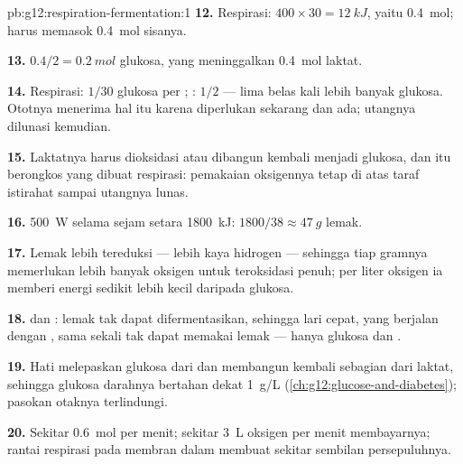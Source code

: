 \begin{solution}{pb:g12:respiration-fermentation:1}
\textbf{12.} Respirasi: $400 \times 30 = \qty{12}{kJ}$, yaitu
\qty{0.4}{mol};  harus memasok \qty{0.4}{mol} sisanya.

\textbf{13.} $0.4/2 = \qty{0.2}{mol}$ glukosa, yang meninggalkan \qty{0.4}{mol}
laktat.

\textbf{14.} Respirasi: $1/30$ glukosa per ; : $1/2$
--- lima belas kali lebih banyak glukosa. Ototnya menerima hal itu
karena  diperlukan sekarang dan  ada; utangnya dilunasi
kemudian.

\textbf{15.} Laktatnya harus dioksidasi atau dibangun kembali menjadi
glukosa, dan itu berongkos  yang dibuat respirasi: pemakaian
oksigennya tetap di atas taraf istirahat sampai utangnya lunas.

\textbf{16.} \qty{500}{W} selama sejam setara \qty{1800}{kJ}: $1800/38
\approx \qty{47}{g}$ lemak.

\textbf{17.} Lemak lebih tereduksi --- lebih kaya hidrogen --- sehingga
tiap gramnya memerlukan lebih banyak oksigen untuk teroksidasi penuh;
per liter oksigen ia memberi energi sedikit lebih kecil daripada
glukosa.

\textbf{18.}  dan : lemak tak dapat
difermentasikan, sehingga lari cepat, yang berjalan dengan ,
sama sekali tak dapat memakai lemak --- hanya glukosa dan .

\textbf{19.} Hati melepaskan glukosa dari  dan membangun
kembali sebagian dari laktat, sehingga glukosa darahnya bertahan dekat
\qty{1}{g/L} (\cref{ch:g12:glucose-and-diabetes}); pasokan otaknya
terlindungi.

\textbf{20.} Sekitar \qty{0.6}{mol}  per menit; sekitar
\qty{3}{L} oksigen per menit membayarnya; rantai respirasi pada
membran dalam  membuat sekitar sembilan persepuluhnya.
\end{solution}
